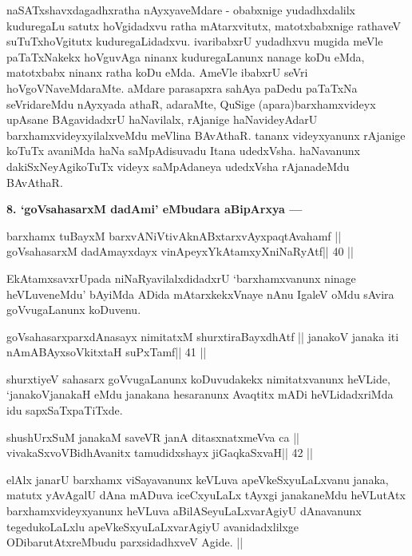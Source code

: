 \begin{artha}
naSATxshavxdagadhxratha nAyxyaveMdare - obabxnige yudadhxdalilx 
kuduregaLu satutx hoVgidadxvu ratha mAtarxvitutx, matotxbabxnige 
rathaveV suTuTxhoVgitutx kuduregaLidadxvu. ivaribabxrU yudadhxvu mugida 
meVle paTaTxNakekx hoVguvAga ninanx kuduregaLanunx nanage koDu eMda, 
matotxbabx ninanx ratha koDu eMda. AmeVle ibabxrU seVri 
hoVgoVNaveMdaraMte. aMdare parasapxra sahAya paDedu paTaTxNa 
seVridareMdu nAyxyada athaR, adaraMte, QuSige (apara)barxhamxvideyx upAsane BAgavidadxrU haNavilalx, rAjanige haNavideyAdarU barxhamxvideyxyilalxveMdu meVlina BAvAthaR. tananx videyxyanunx rAjanige koTuTx avaniMda haNa saMpAdisuvadu Itana udedxVsha. haNavanunx dakiSxNeyAgikoTuTx videyx saMpAdaneya udedxVsha rAjanadeMdu BAvAthaR.
\end{artha}

\begin{artha}
{\bf 8. `goVsahasarxM dadAmi' eMbudara aBipArxya ---}
\end{artha} 

\begin{shl}
barxhamx tuBayxM barxvANiVtivAknABxtarxvAyxpaqtAvahamf ||
goVsahasarxM dadAmayxdayx vinA\s peyxYkAtamxyXniNaRyAtf\hfill || 40 ||
\end{shl}

\begin{artha}
EkAtamxsavxrUpada niNaRyavilalxdidadxrU `barxhamxvanunx ninage 
heVLuveneMdu' bAyiMda ADida mAtarxkekxVnaye nAnu IgaleV oMdu sAvira goVvugaLanunx koDuvenu.
\end{artha}

\begin{shl}
goVsahasarxparxdAnasayx nimitatxM shurxtiraBayxdhAtf ||
janakoV janaka iti nAmABAyxsoVkitxtaH suPxTamf\hfill || 41 ||
\end{shl}

\begin{artha}
shurxtiyeV sahasarx goVvugaLanunx koDuvudakekx nimitatxvanunx heVLide, `janakoVjanakaH eMdu janakana hesaranunx Avaqtitx mADi heVLidadxriMda idu sapxSaTxpaTiTxde.
\end{artha}

\begin{shl}
shushUrxSuM janakaM saveVR janA ditasxnatxmeVva ca ||
vivakaSxvoV\s BidhAvanitx tamudidxshayx jiGaqkaSxvaH\hfill || 42 ||
\end{shl}

\begin{artha}
elAlx janarU barxhamx viSayavanunx keVLuva apeVkeSxyuLaLxvanu janaka, matutx yAvAgalU dAna mADuva iceCxyuLaLx tAyxgi janakaneMdu heVLutAtx barxhamxvideyxyanunx heVLuva aBilASeyuLaLxvarAgiyU dAnavanunx tegedukoLaLxlu apeVkeSxyuLaLxvarAgiyU avanidadxlilxge ODibarutAtxreMbudu parxsidadhxveV Agide. ||
\end{artha}


